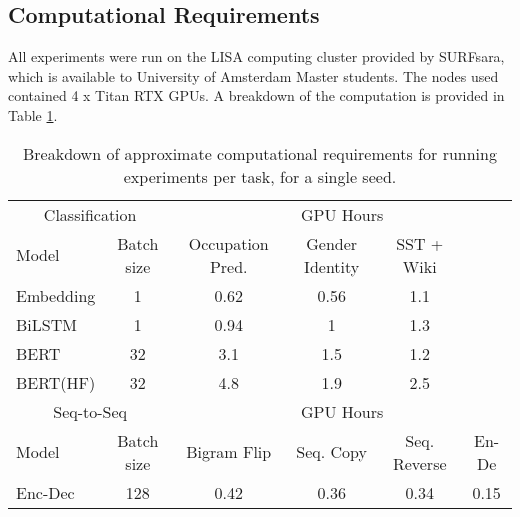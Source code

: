 \subsection{Computational Requirements}
\label{sec:infrastructure}

All experiments were run on the LISA computing cluster provided by SURFsara, which is available to University of Amsterdam Master students. The nodes used contained 4 x Titan RTX GPUs. A breakdown of the computation is provided in Table \ref{tab:computation-table}.

\begin{table}
  \caption{Breakdown of approximate computational requirements for running experiments per task, for a single seed.}
  \label{tab:computation-table}
  \centering
   \setlength\tabcolsep{5pt}
  \begin{tabular}{lc|cccc}
    \toprule
    \multicolumn{2}{c}{Classification} & \multicolumn{4}{c}{GPU Hours} \\
    \cmidrule(r){1-6}
    Model     & Batch size       & Occupation Pred.  & Gender Identity & SST + Wiki \\
    \midrule
    Embedding & 1     & 0.62  & 0.56 & 1.1 \\
    BiLSTM     & 1     & 0.94  & 1 & 1.3 \\
    BERT     & 32     & 3.1  & 1.5 & 1.2 \\
    BERT(HF)     & 32    & 4.8  & 1.9 & 2.5 \\
    \toprule
    \multicolumn{2}{c}{Seq-to-Seq} & \multicolumn{4}{c}{GPU Hours} \\
    \cmidrule(r){1-6}
    Model     & Batch size       & Bigram Flip     & Seq. Copy     & Seq. Reverse     & En-De \\
    \midrule
    Enc-Dec & 128  & 0.42  & 0.36 & 0.34 & 0.15 \\
    \bottomrule
  \end{tabular}
\end{table}

